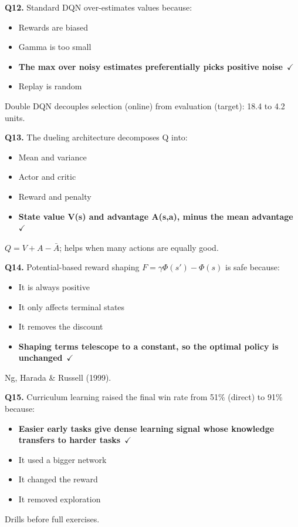 \documentclass[11pt]{article}
\begin{document}
{\noindent\textbf{Q12.} Standard DQN over-estimates values because:\begin{itemize}[leftmargin=2.2em,itemsep=0pt,topsep=1pt]\item[A.] Rewards are biased\item[B.] Gamma is too small\item[\textbf{C.}] \textbf{The max over noisy estimates preferentially picks positive noise}~{\color{GrnN}$\checkmark$}\item[D.] Replay is random\end{itemize} Double DQN decouples selection (online) from evaluation (target): 18.4 to 4.2 units.\par\medskip

\noindent\textbf{Q13.} The dueling architecture decomposes Q into:\begin{itemize}[leftmargin=2.2em,itemsep=0pt,topsep=1pt]\item[A.] Mean and variance\item[B.] Actor and critic\item[C.] Reward and penalty\item[\textbf{D.}] \textbf{State value V(s) and advantage A(s,a), minus the mean advantage}~{\color{GrnN}$\checkmark$}\end{itemize} $Q=V+A-\bar A$; helps when many actions are equally good.\par\medskip

\noindent\textbf{Q14.} Potential-based reward shaping $F=\gamma\Phi(s')-\Phi(s)$ is safe because:\begin{itemize}[leftmargin=2.2em,itemsep=0pt,topsep=1pt]\item[A.] It is always positive\item[B.] It only affects terminal states\item[C.] It removes the discount\item[\textbf{D.}] \textbf{Shaping terms telescope to a constant, so the optimal policy is unchanged}~{\color{GrnN}$\checkmark$}\end{itemize} Ng, Harada \& Russell (1999).\par\medskip

\noindent\textbf{Q15.} Curriculum learning raised the final win rate from 51\% (direct) to 91\% because:\begin{itemize}[leftmargin=2.2em,itemsep=0pt,topsep=1pt]\item[\textbf{A.}] \textbf{Easier early tasks give dense learning signal whose knowledge transfers to harder tasks}~{\color{GrnN}$\checkmark$}\item[B.] It used a bigger network\item[C.] It changed the reward\item[D.] It removed exploration\end{itemize} Drills before full exercises.\par\medskip

}
\end{document}
